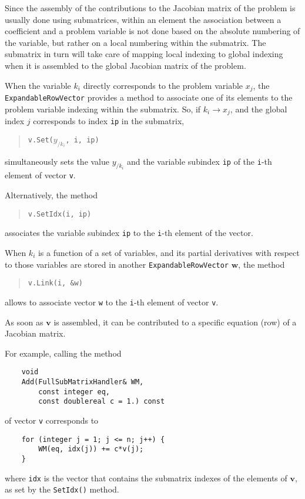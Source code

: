 \documentclass[10pt,fleqn,subeqn]{report}
\newcommand{\T}[1]{\bm{#1}}
\begin{document}
Since the assembly of the contributions to the Jacobian matrix of the problem
is usually done using submatrices, within an element the association between
a coefficient and a problem variable is not done based on the absolute numbering
of the variable, but rather on a local numbering within the submatrix.
The submatrix in turn will take care of mapping local indexing to global indexing
when it is assembled to the global Jacobian matrix of the problem.

When the variable $k_i$ directly corresponds to the problem variable $x_j$,
the \texttt{ExpandableRowVector} provides a method to associate
one of its elements to the problem variable indexing within the submatrix.
So, if $k_i\rightarrow x_j$, and the global index $j$ corresponds
to index \texttt{ip} in the submatrix,
\begin{quote}
\texttt{v.Set($y_{/k_i}$, i, ip)}
\end{quote}
simultaneously sets the value $y_{/k_i}$
and the variable subindex \texttt{ip}
of the \texttt{i}-th element of vector \texttt{v}.

Alternatively, the method
\begin{quote}
\texttt{v.SetIdx(i, ip)}
\end{quote}
associates the variable subindex \texttt{ip}
to the \texttt{i}-th element of the vector.

When $k_i$ is a function of a set of variables,
and its partial derivatives with respect to those variables
are stored in another \texttt{ExpandableRowVector} $\T{w}$,
the method
\begin{quote}
\texttt{v.Link(i, \&w)}
\end{quote}
allows to associate vector \texttt{w} to the \texttt{i}-th element
of vector \texttt{v}.

As soon as $\T{v}$ is assembled, it can be contributed
to a specific equation (row) of a Jacobian matrix.

For example, calling the method
\begin{verbatim}
    void
    Add(FullSubMatrixHandler& WM,
        const integer eq,
        const doublereal c = 1.) const
\end{verbatim}
of vector \texttt{v} corresponds to
\begin{verbatim}
    for (integer j = 1; j <= n; j++) {
        WM(eq, idx(j)) += c*v(j);
    }
\end{verbatim}
where \texttt{idx} is the vector that contains the submatrix indexes
of the elements of $\T{v}$, as set by the \texttt{SetIdx()} method.
\end{document}
